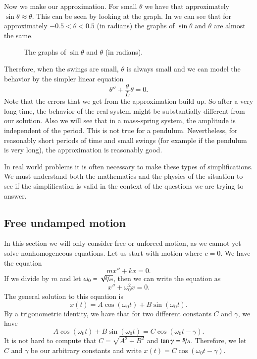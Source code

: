 \documentclass[12pt]{book}
\begin{document}
Now we make our approximation.  For small $\theta$ we have that approximately
$\sin \theta \approx \theta$.  This can be seen by looking at the graph.
In  we can see that for approximately
$-0.5 < \theta < 0.5$ (in radians) the graphs of $\sin \theta$ and $\theta$ are almost the
same.

\begin{figure}[h!t]
\capstart
\begin{center}
\caption{The graphs of $\sin \theta$ and $\theta$ (in radians).\label{mv:sinthetafig}}
\end{center}
\end{figure}

Therefore, when the swings are small, $\theta$ is always small and we can
model the behavior by the simpler linear equation
\begin{equation*}
\theta'' + \frac{g}{L} \theta = 0 .
\end{equation*}
Note that the errors that we get from the approximation build up.
So after a
very long time, the behavior of the real system might be substantially
different from our solution.  Also we will
see that in a mass-spring system, the amplitude is independent of the
period.
This is not true for a pendulum.  Nevertheless, for reasonably short periods of time
and small swings (for example if the pendulum is very long),
the approximation is reasonably good.

In real world problems it is often necessary to make these types of
simplifications.  We must understand both the mathematics and
the physics of the situation to see if the simplification is valid in the
context of the questions we are trying to answer.

\subsection{Free undamped motion}

In this section we will only consider free or unforced motion,
as we cannot yet solve nonhomogeneous equations.  Let us start with
 motion where $c=0$.  We have the equation
\begin{equation*}
mx'' + kx = 0 .
\end{equation*}
If we divide by $m$ and let $\omega_0 = \sqrt{\nicefrac{k}{m}}$, then we can write the equation as
\begin{equation*}
x'' + \omega_0^2 x = 0 .
\end{equation*}
The general solution to this equation is
\begin{equation*}
x(t) = A \cos (\omega_0 t) + B \sin (\omega_0 t) .
\end{equation*}
By a trigonometric identity, we have that for two 
different
constants $C$ and $\gamma$, we have
\begin{equation*}
A \cos (\omega_0 t) + B \sin (\omega_0 t) =
C \cos ( \omega_0 t - \gamma ) .
\end{equation*}
It is not hard to compute that $C= \sqrt{A^2 + B^2}$ and $\tan \gamma =
\nicefrac{B}{A}$.  Therefore, we let
$C$ and $\gamma$ be our arbitrary constants and write
$x(t) = C \cos ( \omega_0 t - \gamma )$.
\end{document}
